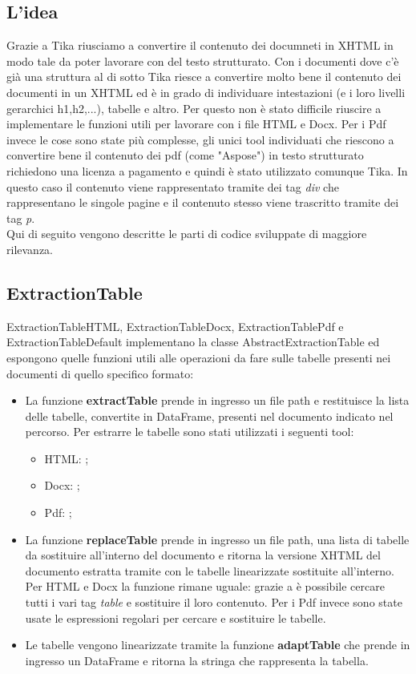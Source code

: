 \subsection{L'idea}
Grazie a Tika riusciamo a convertire il contenuto dei documneti in XHTML in modo tale da poter lavorare con del testo strutturato.
Con i documenti dove c'è già una struttura al di sotto Tika riesce a convertire molto bene il contenuto dei documenti in un XHTML ed è in grado di individuare intestazioni (e i loro livelli gerarchici h1,h2,...), tabelle e altro.
Per questo non è stato difficile riuscire a implementare le funzioni utili per lavorare con i file HTML e Docx.
Per i Pdf invece le cose sono state più complesse, gli unici tool individuati che riescono a convertire bene il contenuto dei pdf (come "Aspose") in testo strutturato richiedono una licenza a pagamento e quindi è stato utilizzato comunque Tika.
In questo caso il contenuto viene rappresentato tramite dei tag \emph{div} che rappresentano le singole pagine e il contenuto stesso viene trascritto tramite dei tag \emph{p}. \\

\noindent Qui di seguito vengono descritte le parti di codice sviluppate di maggiore rilevanza.

\subsection{ExtractionTable}
ExtractionTableHTML, ExtractionTableDocx, ExtractionTablePdf e ExtractionTableDefault implementano la classe AbstractExtractionTable ed espongono quelle funzioni utili alle operazioni da fare sulle tabelle presenti nei documenti di quello specifico formato:
\begin{itemize}
    \item La funzione \textbf{extractTable} prende in ingresso un file path e restituisce la lista delle tabelle, convertite in DataFrame, presenti nel documento indicato nel percorso. Per estrarre le tabelle sono stati utilizzati i seguenti tool:
    \begin{itemize}
        \item HTML: ;
        \item Docx: ;
        \item Pdf: ;
    \end{itemize}
    \item La funzione \textbf{replaceTable} prende in ingresso un file path, una lista di tabelle da sostituire all'interno del documento e ritorna la versione XHTML del documento estratta tramite  con le tabelle linearizzate sostituite all'interno.
    Per HTML e Docx la funzione rimane uguale: grazie a  è possibile cercare tutti i vari tag \emph{table} e sostituire il loro contenuto. Per i Pdf invece sono state usate le espressioni regolari per cercare e sostituire le tabelle. 
    \item Le tabelle vengono linearizzate tramite la funzione \textbf{adaptTable} che prende in ingresso un DataFrame e ritorna la stringa che rappresenta la tabella.
\end{itemize} 

